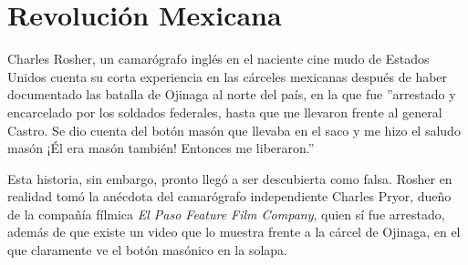\chapter{Revolución Mexicana}

Charles Rosher, un camarógrafo inglés en el naciente cine mudo de Estados Unidos cuenta su corta experiencia en las cárceles mexicanas después de haber documentado las batalla de Ojinaga al norte del país, en la que fue ''arrestado y encarcelado por los soldados federales, hasta que me llevaron frente al general Castro. Se dio cuenta del botón masón que llevaba en el saco y me hizo el saludo masón ¡Él era masón también! Entonces me liberaron.''\cite{rocha2003}

Esta historia, sin embargo, pronto llegó a ser descubierta como falsa. Rosher en realidad tomó la anécdota del camarógrafo independiente Charles Pryor, dueño de la compañía fílmica \emph{El Paso Feature Film Company}\cite{worthington2010}, quien sí fue arrestado, además de que existe un video que lo muestra frente a la cárcel de Ojinaga, en el que claramente ve el botón masónico en la solapa.